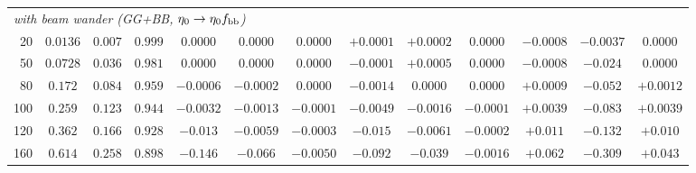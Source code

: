\begin{table}[htbp]
\begin{tabular}{rcccccccccccc}
\midrule
\multicolumn{13}{l}{\emph{with beam wander (GG+BB, $\eta_0\to\eta_0f_{\rm bb}$)}} \\
20 & $0.0136$ & $0.007$ & $0.999$ & $0.0000$ & $0.0000$ & $0.0000$ & $+0.0001$ & $+0.0002$ & $0.0000$ & $-0.0008$ & $-0.0037$ & $0.0000$ \\
50 & $0.0728$ & $0.036$ & $0.981$ & $0.0000$ & $0.0000$ & $0.0000$ & $-0.0001$ & $+0.0005$ & $0.0000$ & $-0.0008$ & $-0.024$ & $0.0000$ \\
80 & $0.172$ & $0.084$ & $0.959$ & $-0.0006$ & $-0.0002$ & $0.0000$ & $-0.0014$ & $0.0000$ & $0.0000$ & $+0.0009$ & $-0.052$ & $+0.0012$ \\
100 & $0.259$ & $0.123$ & $0.944$ & $-0.0032$ & $-0.0013$ & $-0.0001$ & $-0.0049$ & $-0.0016$ & $-0.0001$ & $+0.0039$ & $-0.083$ & $+0.0039$ \\
120 & $0.362$ & $0.166$ & $0.928$ & $-0.013$ & $-0.0059$ & $-0.0003$ & $-0.015$ & $-0.0061$ & $-0.0002$ & $+0.011$ & $-0.132$ & $+0.010$ \\
160 & $0.614$ & $0.258$ & $0.898$ & $-0.146$ & $-0.066$ & $-0.0050$ & $-0.092$ & $-0.039$ & $-0.0016$ & $+0.062$ & $-0.309$ & $+0.043$ \\

\bottomrule
\end{tabular}
\end{table}

